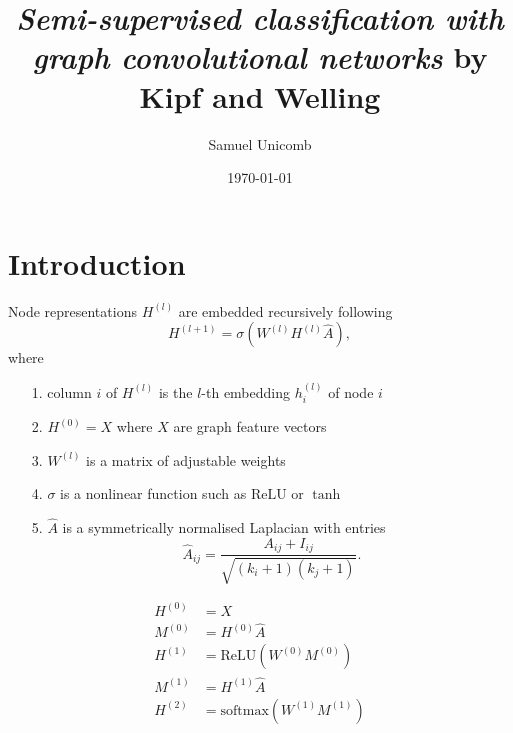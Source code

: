 \documentclass[mathserif,10pt]{beamer}
\title{\large \emph{Semi-supervised classification with graph convolutional networks} by Kipf and Welling}
\author{\scriptsize Samuel Unicomb}
\institute{\scriptsize MACSI, Department of Mathematics and Statistics, University of Limerick}
\date{\scriptsize \today}
\begin{document}
\def\fontspec{\fontsize{9pt}{11}\selectfont}

\begin{frame}
	\titlepage
\end{frame}

\section{Introduction}

\begin{frame}
  Node representations $H^{(l)}$ are embedded recursively following
  \begin{equation}
    H^{(l + 1)} = \sigma\left(W^{(l)} H^{(l)} \hat{A} \right),
  \end{equation}
  where
  \begin{itemize}
    \item[1.] column $i$ of $H^{(l)}$ is the $l$-th embedding $h^{(l)}_i$ of node $i$
    \item[2.] $H^{(0)} = X$ where $X$ are graph feature vectors
    \item[3.] $W^{(l)}$ is a matrix of adjustable weights
    \item[4.] $\sigma$ is a nonlinear function such as $\text{ReLU}$ or $\tanh$
    \item[5.] $\hat{A}$ is a symmetrically normalised Laplacian with entries
    \begin{equation*}
      \hat{A}_{ij} = \dfrac{A_{ij} + I_{ij}}{\sqrt{(k_i + 1)(k_j + 1)}}.
    \end{equation*}
  \end{itemize}
\end{frame}

\begin{frame}
  \begin{subequations}
     \begin{align}
        H^{(0)} &= X \\
        M^{(0)} &= H^{(0)}\hat{A} \\
        H^{(1)} &= \text{ReLU}\left(W^{(0)} M^{(0)}\right) \\
        M^{(1)} &= H^{(1)}\hat{A} \\
        H^{(2)} &= \text{softmax}\left(W^{(1)} M^{(1)}\right)
     \end{align}
  \end{subequations}
\end{frame}
\end{document}
